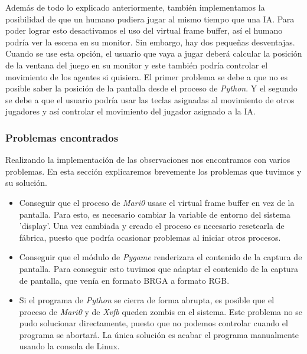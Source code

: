 Además de todo lo explicado anteriormente, también implementamos la posibilidad de que un humano pudiera jugar al mismo tiempo que una IA. Para poder lograr esto desactivamos el uso del virtual frame buffer, así el humano podría ver la escena en su monitor. Sin embargo, hay dos pequeñas desventajas. Cuando se use esta opción, el usuario que vaya a jugar deberá calcular la posición de la ventana del juego en su monitor y este también podría controlar el movimiento de los agentes si quisiera. El primer problema se debe a que no es posible saber la posición de la pantalla desde el proceso de \textit{Python}. Y el segundo se debe a que el usuario podría usar las teclas asignadas al movimiento de otros jugadores y así controlar el movimiento del jugador asignado a la IA.


\subsubsection*{Problemas encontrados}

Realizando la implementación de las observaciones nos encontramos con varios problemas. En esta sección explicaremos brevemente los problemas que tuvimos y su solución.

\begin{itemize}
    \item Conseguir que el proceso de \textit{Mari0} usase el virtual frame buffer en vez de la pantalla. Para esto, es necesario cambiar la variable de entorno del sistema 'display'. Una vez cambiada y creado el proceso es necesario resetearla de fábrica, puesto que podría ocasionar problemas al iniciar otros procesos.
    \item Conseguir que el módulo de \textit{Pygame} renderizara el contenido de la captura de pantalla. Para conseguir esto tuvimos que adaptar el contenido de la captura de pantalla, que venía en formato BRGA a formato RGB.
    \item Si el programa de \textit{Python} se cierra de forma abrupta, es posible que el proceso de \textit{Mari0} y de \textit{Xvfb} queden zombis en el sistema. Este problema no se pudo solucionar directamente, puesto que no podemos controlar cuando el programa se abortará. La única solución es acabar el programa manualmente usando la consola de Linux.
\end{itemize}



